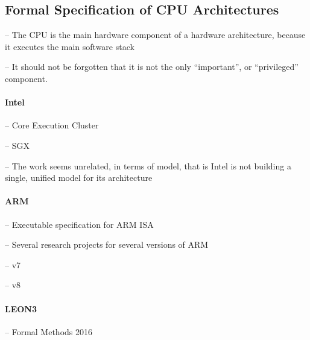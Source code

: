 \subsection{Formal Specification of CPU Architectures}

\begin{compactitem}
\item[--] The CPU is the main hardware component of a hardware architecture,
  because it executes the main software stack
\item[--] It should not be forgotten that it is not the only ``important'', or
  ``privileged'' component.
\end{compactitem}

\paragraph{Intel}
%
\begin{compactitem}
\item[--] Core Execution Cluster\,\cite{kaivola2009formalintel}
\item[--] SGX\,\cite{leslie2015sgx}
\item[--] The work seems unrelated, in terms of model, that is Intel is not
  building a single, unified model for its architecture
\end{compactitem}

\paragraph{ARM}
%
\begin{compactitem}
\item[--] Executable specification for ARM ISA
\item[--] Several research projects for several versions of ARM
  \begin{compactitem}
  \item[--] v7\,\cite{fox2010armv7}
  \item[--] v8\,\cite{reid2016armv8}
  \end{compactitem}
\end{compactitem}

\paragraph{LEON3}
%
\begin{compactitem}
\item[--] Formal Methods 2016
\end{compactitem}

